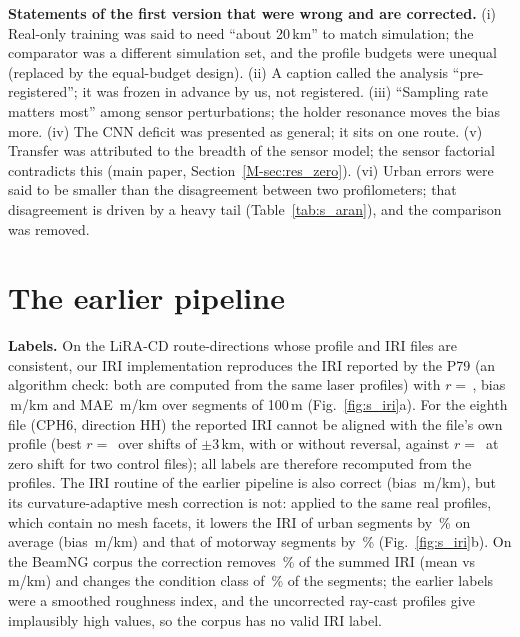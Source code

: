 \documentclass[onecolumn,10pt]{IEEEtran}
\begin{document}
\textbf{Statements of the first version that were wrong and are corrected.}
(i) Real-only training was said to need ``about 20\,km'' to match simulation; the comparator was a different simulation set, and the profile budgets were unequal (replaced by the equal-budget design). (ii) A caption called the analysis ``pre-registered''; it was frozen in advance by us, not registered. (iii) ``Sampling rate matters most'' among sensor perturbations; the holder resonance moves the bias more. (iv) The CNN deficit was presented as general; it sits on one route. (v) Transfer was attributed to the breadth of the sensor model; the sensor factorial contradicts this (main paper, Section~\ref{M-sec:res_zero}). (vi) Urban errors were said to be smaller than the disagreement between two profilometers; that disagreement is driven by a heavy tail (Table~\ref{tab:s_aran}), and the comparison was removed.

\section{The earlier pipeline}
\label{sec:s_earlier}
\textbf{Labels.}
On the \iriValFiles{} LiRA-CD route-directions whose profile and IRI files are consistent, our IRI implementation reproduces the IRI reported by the P79 (an algorithm check: both are computed from the same laser profiles) with $r=$\,\iriValR, bias \iriValBias\,m/km and MAE \iriValMae\,m/km over \iriValN{} segments of 100\,m (Fig.~\ref{fig:s_iri}a).
For the eighth file (CPH6, direction HH) the reported IRI cannot be aligned with the file's own profile (best $r=$\,\alignBestR{} over shifts of $\pm$3\,km, with or without reversal, against $r=$\,\alignControlR{} at zero shift for two control files); all labels are therefore recomputed from the profiles.
The IRI routine of the earlier pipeline is also correct (bias \legacyCoreBias\,m/km), but its curvature-adaptive mesh correction is not: applied to the same real profiles, which contain no mesh facets, it lowers the IRI of urban segments by \legacyCorrUrbanMape\,\% on average (bias \legacyCorrUrbanBias\,m/km) and that of motorway segments by \legacyCorrMotorwayMape\,\% (Fig.~\ref{fig:s_iri}b).
On the BeamNG corpus the correction removes \bngCorrReduction\,\% of the summed IRI (mean \bngIriRawMean{} vs \bngIriCorrMean\,m/km) and changes the condition class of \bngClassChange\,\% of the segments; the earlier labels were a smoothed roughness index, and the uncorrected ray-cast profiles give implausibly high values, so the corpus has no valid IRI label.
\end{document}
